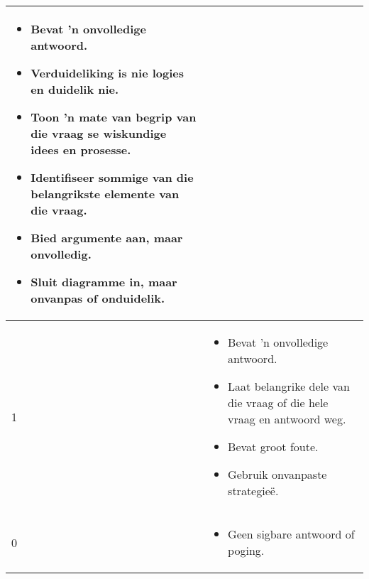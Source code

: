 \begin{table}[H]
\begin{center}
\begin{tabular}{|p{3cm}|p{8.5cm}|}
\begin{itemize}[noitemsep]
\item
  Bevat 'n onvolledige antwoord.
\item
  Verduideliking is nie logies en duidelik nie.
\item
  Toon 'n mate van begrip van die vraag se wiskundige idees en prosesse.
\item
  Identifiseer sommige van die belangrikste elemente van die vraag.
\item
   Bied argumente aan, maar onvolledig.
\item
  Sluit diagramme in, maar onvanpas of onduidelik.
\end{itemize} \\ \hline
1 &
\begin{itemize}[noitemsep]
\item
  Bevat 'n onvolledige antwoord.
\item
  Laat belangrike dele van die vraag of die hele vraag en antwoord weg.
\item
  Bevat groot foute.
\item
  Gebruik onvanpaste strategie\"{e}.
\end{itemize} \\ \hline
0 &
\begin{itemize}[noitemsep]
\item
Geen sigbare antwoord of poging.
\end{itemize} \\ \hline
  \end{tabular}

 \end{center}

\end{table}

